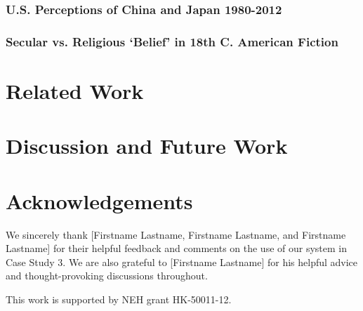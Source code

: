 \documentclass{sig-alternate}
\begin{document}
\subsubsection{U.S. Perceptions of China and Japan 1980-2012}

\subsubsection{Secular vs. Religious `Belief'  in 18th C. American Fiction}

\section {Related Work}

\section{Discussion and Future Work}

\section{Acknowledgements}
We sincerely thank [Firstname Lastname, Firstname Lastname, and Firstname Lastname] for their helpful feedback and comments on the use of our system in Case Study 3. We are also grateful to [Firstname Lastname] for his helpful advice and thought-provoking discussions throughout.

This work is supported by NEH grant HK-50011-12.


 
  
\end{document}

